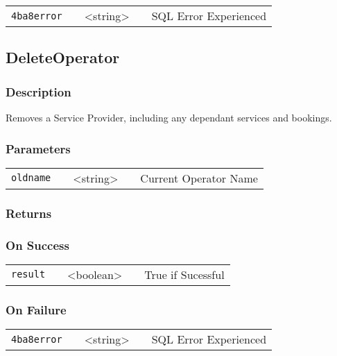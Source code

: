 \documentclass[a4paper,12pt]{article}
\begin{document}
\begin{tabular}{ccccc}
\verb!4ba8error! & \vspace{15mm} & <string> & \vspace{15mm} & SQL Error Experienced \\
\end{tabular}


\subsection{DeleteOperator}

\subsubsection{Description}

Removes a Service Provider, including any dependant services and
bookings.  

\subsubsection{Parameters}

\begin{tabular}{ccccc}
\verb!oldname! & \vspace{15mm} & <string> & \vspace{15mm} & Current Operator Name \\
\end{tabular}

\subsubsection{Returns}

\subsubsection{On Success}

\begin{tabular}{ccccc}
\verb!result! & \vspace{15mm} & <boolean> & \vspace{15mm} & True if Sucessful \\
\end{tabular}

\subsubsection{On Failure}

\begin{tabular}{ccccc}
\verb!4ba8error! & \vspace{15mm} & <string> & \vspace{15mm} & SQL Error Experienced \\
\end{tabular}
\end{document}
